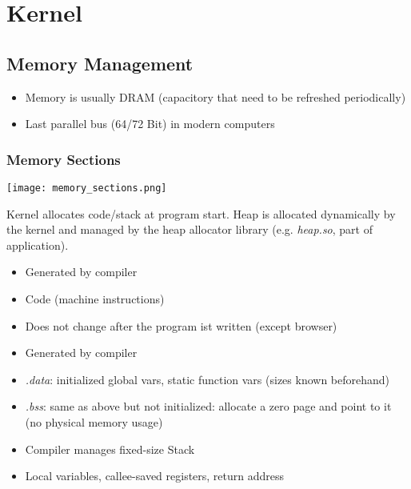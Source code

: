\section{Kernel}
\subsection{Memory Management}
\begin{itemize}
    \item Memory is usually DRAM (capacitory that need to be refreshed periodically)
    \item Last parallel bus (64/72 Bit) in modern computers
\end{itemize}


\subsubsection{Memory Sections}
\texttt{[image: memory\_sections.png]}

Kernel allocates code/stack at program start. Heap is allocated dynamically by the kernel and managed by the heap allocator library (e.g. \textit{heap.so}, part of application).


\begin{itemize}
    \item Generated by compiler
    \item Code (machine instructions)
    \item Does not change after the program ist written (except browser)
\end{itemize}



\begin{itemize}
    \item Generated by compiler
    \item \textit{.data}: initialized global vars, static function vars (sizes known beforehand)
    \item \textit{.bss}: same as above but not initialized: allocate a zero page and point to it (no physical memory usage)
\end{itemize}


\begin{itemize}
    \item Compiler manages fixed-size Stack
    \item Local variables, callee-saved registers, return address
\end{itemize}

